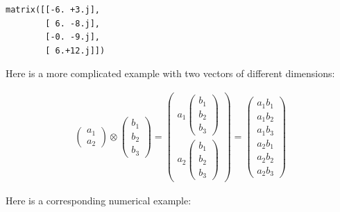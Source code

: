 \documentclass[11pt]{article}
\newcommand{\prompt}[4]{
        \llap{{\color{#2}[#3]: #4}}\vspace{-1.25em}
    }
\begin{document}
            \begin{tcolorbox}[breakable, boxrule=.5pt, size=fbox, pad at break*=1mm, opacityfill=0]
\prompt{Out}{outcolor}{32}{\hspace{3.5pt}}
\begin{Verbatim}[commandchars=\\\{\}]
matrix([[-6. +3.j],
        [ 6. -8.j],
        [-0. -9.j],
        [ 6.+12.j]])
\end{Verbatim}
\end{tcolorbox}
        
    Here is a more complicated example with two vectors of different
dimensions:

    \begin{align}
\begin{pmatrix}
a_1 \\ a_2
\end{pmatrix} \otimes 
\begin{pmatrix}
b_1 \\ b_2 \\ b_3
\end{pmatrix} = 
\begin{pmatrix}
a_1 \begin{pmatrix}
b_1 \\ b_2 \\ b_3
\end{pmatrix} \\
a_2 \begin{pmatrix}
b_1 \\ b_2 \\ b_3
\end{pmatrix}
\end{pmatrix} = 
\begin{pmatrix}
a_1b_1 \\ a_1b_2 \\ a_1b_3 \\ a_2b_1 \\ a_2b_2 \\ a_2b_3
\end{pmatrix}
\end{align}

    Here is a corresponding numerical example:
\end{document}
